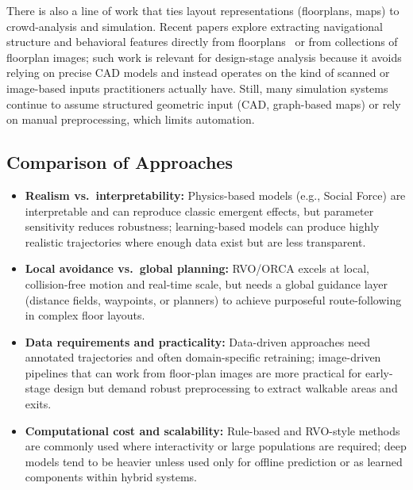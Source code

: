 \documentclass[conference]{IEEEtran}
\begin{document}
There is also a line of work that ties layout representations (floorplans,
maps) to crowd-analysis and simulation. Recent papers explore extracting
navigational structure and behavioral features directly from
floorplans~\cite{chen2018floorplan,battaglia2021path} or from collections of
floorplan images; such work is relevant for design-stage analysis because it
avoids relying on precise CAD models and instead operates on the kind of
scanned or image-based inputs practitioners actually have. Still, many
simulation systems continue to assume structured geometric input (CAD,
graph-based maps) or rely on manual preprocessing, which limits automation.

\subsection{Comparison of Approaches}

\begin{itemize}
    \item \textbf{Realism vs.\ interpretability:} Physics-based models (e.g., Social Force) are interpretable and can reproduce classic emergent effects, but parameter sensitivity reduces robustness; learning-based models can produce highly realistic trajectories where enough data exist but are less transparent.

    \item \textbf{Local avoidance vs.\ global planning:} RVO/ORCA excels at local, collision-free motion and real-time scale, but needs a global guidance layer (distance fields, waypoints, or planners) to achieve purposeful route-following in complex floor layouts.

    \item \textbf{Data requirements and practicality:} Data-driven approaches need annotated trajectories and often domain-specific retraining; image-driven pipelines that can work from floor-plan images are more practical for early-stage design but demand robust preprocessing to extract walkable areas and exits.

    \item \textbf{Computational cost and scalability:} Rule-based and RVO-style methods are commonly used where interactivity or large populations are required; deep models tend to be heavier unless used only for offline prediction or as learned components within hybrid systems.
\end{itemize}
\end{document}
